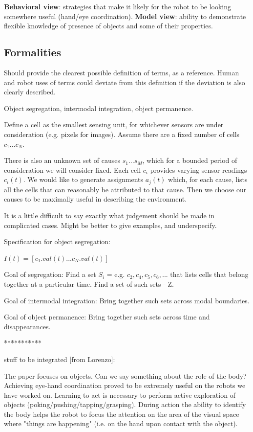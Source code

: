 {\bf Behavioral view}: strategies that make it likely for the robot
to be looking somewhere useful (hand/eye coordination).
{\bf Model view}: ability to demonstrate flexible knowledge of presence of 
objects and some of their properties.


\subsection{Formalities}

Should provide the clearest possible definition of terms,
as a reference.  Human and robot uses of terms could deviate
from this definition if the deviation is also clearly described.

Object segregation, intermodal integration, object permanence.

Define a cell as the smallest sensing unit, for whichever sensors are
under consideration (e.g. pixels for images).  Assume there are a
fixed number of cells $c_1...c_{N}$.

There is also an unknown set of causes $s_1...s_{M}$, which for a
bounded period of consideration we will consider fixed.  Each cell
$c_i$ provides varying sensor readings $c_i(t)$.  We would like to
generate assignments $a_j(t)$ which, for each cause, lists all the
cells that can reasonably be attributed to that cause.  Then we choose
our causes to be maximally useful in describing the environment.

It is a little difficult to say exactly what judgement should be
made in complicated cases.  Might be better to give examples,
and underspecify.

Specification for object segregation:

$I(t) = [c_1.val(t) ... c_N.val(t)]$

Goal of segregation:
  Find a set $S_i$ = e.g. ${ c_2,c_4,c_5,c_6,... }$ that lists cells that
  belong together at a particular time.
  Find a set of such sets - Z.

Goal of intermodal integration:
  Bring together such sets across modal boundaries.

Goal of object permanence:
  Bring together such sets across time and disappearances.


***********

stuff to be integrated [from Lorenzo]:


The paper focuses on objects. Can we say something about the role of the
body? Achieving eye-hand coordination proved to be extremely useful on the
robots we have worked on. Learning to act is necessary to perform active
exploration of objects (poking/pushing/tapping/grasping). During action the
ability to identify the body helps the robot to focus the attention on the
area of the visual space where "things are happening" (i.e. on the hand upon
contact with the object).



